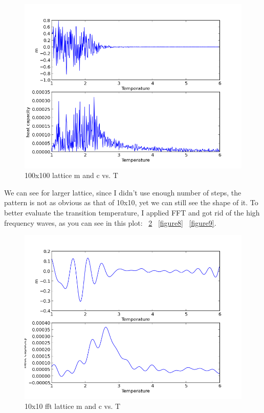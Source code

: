 \documentclass[11pt,letterpaper]{article}
\begin{document}
\begin{figure}
\begin{center}
\includegraphics[width=0.8\linewidth,angle=0]{cp2100.png}
\caption{100x100 lattice m and c vs. T}
\label{figure6}
\end{center}
\end{figure}


We can see for larger lattice, since I didn't use enough number of steps, the pattern is not as obvious as that of 10x10, yet we can still see the shape of it.
To better evaluate the transition temperature, I applied FFT and got rid of the high frequency waves, as you can see in this plot: ~\ref{figure7} ~\ref{figure8} ~\ref{figure9}. 


\begin{figure}
\begin{center}
\includegraphics[width=0.8\linewidth,angle=0]{p2fft10.png}
\caption{10x10 fft lattice m and c vs. T}
\label{figure7}
\end{center}
\end{figure}
\end{document}
